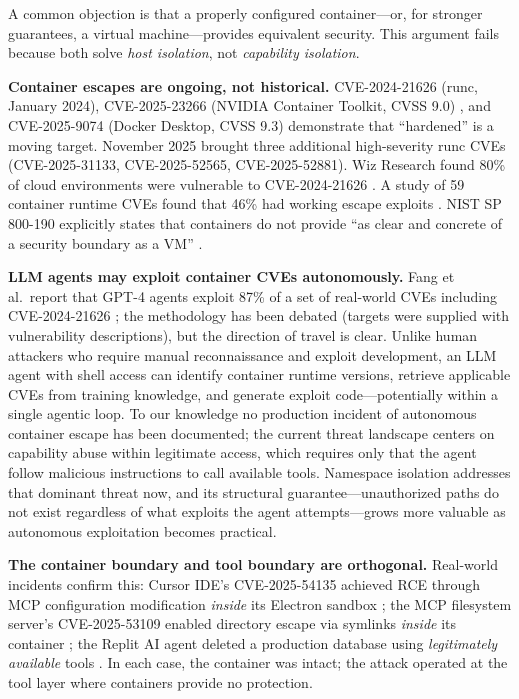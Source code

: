 \documentclass{article}
\begin{document}
A common objection is that a properly configured container---or, for stronger guarantees, a virtual machine---provides equivalent security. This argument fails because both solve \textit{host isolation}, not \textit{capability isolation}.

\textbf{Container escapes are ongoing, not historical.} CVE-2024-21626 (runc, January 2024), CVE-2025-23266 (NVIDIA Container Toolkit, CVSS 9.0) \cite{nvdCVE202523266}, and CVE-2025-9074 (Docker Desktop, CVSS 9.3) \cite{nvdCVE20259074} demonstrate that ``hardened'' is a moving target. November 2025 brought three additional high-severity runc CVEs (CVE-2025-31133, CVE-2025-52565, CVE-2025-52881). Wiz Research found 80\% of cloud environments were vulnerable to CVE-2024-21626 \cite{wiz2024leakyvessels}. A study of 59 container runtime CVEs found that 46\% had working escape exploits \cite{lin2021container}. NIST SP 800-190 explicitly states that containers do not provide ``as clear and concrete of a security boundary as a VM'' \cite{nist800190}.

\textbf{LLM agents may exploit container CVEs autonomously.} Fang et al.\ report that GPT-4 agents exploit 87\% of a set of real-world CVEs including CVE-2024-21626 \cite{fang2024llmagents}; the methodology has been debated (targets were supplied with vulnerability descriptions), but the direction of travel is clear. Unlike human attackers who require manual reconnaissance and exploit development, an LLM agent with shell access can identify container runtime versions, retrieve applicable CVEs from training knowledge, and generate exploit code---potentially within a single agentic loop. To our knowledge no production incident of autonomous container escape has been documented; the current threat landscape centers on capability abuse within legitimate access, which requires only that the agent follow malicious instructions to call available tools. Namespace isolation addresses that dominant threat now, and its structural guarantee---unauthorized paths do not exist regardless of what exploits the agent attempts---grows more valuable as autonomous exploitation becomes practical.

\textbf{The container boundary and tool boundary are orthogonal.} Real-world incidents confirm this: Cursor IDE's CVE-2025-54135 achieved RCE through MCP configuration modification \textit{inside} its Electron sandbox \cite{cursor2025rce}; the MCP filesystem server's CVE-2025-53109 enabled directory escape via symlinks \textit{inside} its container \cite{nvdCVE202553109}; the Replit AI agent deleted a production database using \textit{legitimately available} tools \cite{replit2025incident}. In each case, the container was intact; the attack operated at the tool layer where containers provide no protection.
\end{document}
